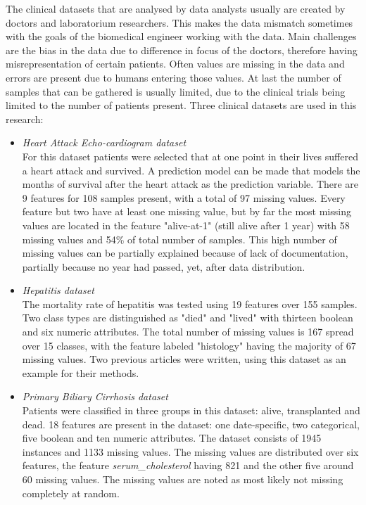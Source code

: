 \documentclass[10pt,a4paper]{report}
\begin{document}
	The clinical datasets that are analysed by data analysts usually are created by doctors and laboratorium researchers. This makes the data mismatch sometimes with the goals of the biomedical engineer working with the data. Main challenges are the bias in the data due to difference in focus of the doctors, therefore having misrepresentation of certain patients. Often values are missing in the data and errors are present due to humans entering those values\cite{pocock2013clinical}. At last the number of samples that can be gathered is usually limited, due to the clinical trials being limited to the number of patients present. Three clinical datasets are used in this research:
	
	\begin{itemize}
		\item \textit{Heart Attack Echo-cardiogram dataset} \\ For this dataset patients were selected that at one point in their lives suffered a heart attack and survived\cite{kan1986short}. A prediction model can be made that models the months of survival after the heart attack as the prediction variable. There are 9 features for 108 samples present, with a total of 97 missing values. Every feature but two have at least one missing value, but by far the most missing values are located in the feature "alive-at-1" (still alive after 1 year) with 58 missing values and 54\% of total number of samples. This high number of missing values can be partially explained because of lack of documentation, partially because no year had passed, yet, after data distribution. %
		\item \textit{Hepatitis dataset} \\ The mortality rate of hepatitis was tested using 19 features over 155 samples\cite{diaconis1983computer, cestnikkononenkoj}. Two class types are distinguished as "died" and "lived" with thirteen boolean and six numeric attributes. The total number of missing values is 167 spread over 15 classes, with the feature labeled "histology" having the majority of 67 missing values. Two previous articles were written, using this dataset as an example for their methods\cite{diaconis1983computer, cestnikkononenkoj}.
		\item \textit{Primary Biliary Cirrhosis dataset} \\ Patients were classified in three groups in this dataset: alive, transplanted and dead\cite{murtaugh1994primary}. 18 features are present in the dataset: one date-specific, two categorical, five boolean and ten numeric attributes. The dataset consists of 1945 instances and 1133 missing values. The missing values are distributed over six features, the feature \textit{serum\_cholesterol} having 821 and the other five around 60 missing values. The missing values are noted as most likely not missing completely at random. %
	\end{itemize}
	
\end{document}

